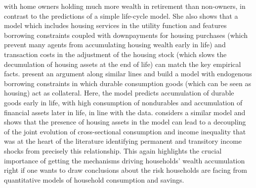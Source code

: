 with home owners holding much more wealth in retirement than non-owners, in 
contrast to the predictions of a simple life-cycle model. She also shows that
a model which includes housing services in the utility function and features
borrowing constraints coupled with downpayments for housing purchases (which 
prevent many agents from accumulating housing wealth early in life) and transaction
costs in the adjustment of the housing stock (which slows the decumulation of
housing assets at the end of life) can match the key empirical facts. 
\citet{FernandezVillaverdeKrueger2011} present an argument along similar lines 
and build a model with endogenous borrowing constraints in which durable consumption
goods (which can be seen as housing) act as collateral. Here, the model predicts
accumulation of durable goods early in life, with high consumption of nondurables
and accumulation of financial assets later in life, in line with the data. 
\citet{Iacoviello2008} considers a similar model and shows that the presence
of housing assets in the model can lead to a decoupling of the joint evolution
of cross-sectional consumption and income inequality that was at the heart of
the literature identifying permanent and transitory income shocks from precisely
this relationship. This again highlights the crucial importance of getting the 
mechanisms driving households' wealth accumulation right if one wants to draw 
conclusions about the risk households are facing from quantitative models of 
household consumption and savings.

